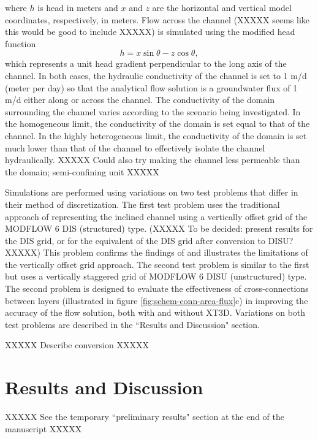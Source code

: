 \documentclass{article}
\begin{document}
\noindent where $h$ is head in meters and $x$ and $z$ are the horizontal and vertical model coordinates, respectively, in meters. Flow across the channel (XXXXX seems like this would be good to include XXXXX) is simulated using the modified head function
\begin{equation}
\label{eqn:head_analyt_across}
h = x \sin \theta - z \cos \theta,
\end{equation}
which represents a unit head gradient perpendicular to the long axis of the channel. In both cases, the hydraulic conductivity of the channel is set to 1 m/d (meter per day) so that the analytical flow solution is a groundwater flux of 1 m/d either along or across the channel. The conductivity of the domain surrounding the channel varies according to the scenario being investigated. In the homogeneous limit, the conductivity of the domain is set equal to that of the channel. In the highly heterogeneous limit, the conductivity of the domain is set much lower than that of the channel to effectively isolate the channel hydraulically. XXXXX Could also try making the channel less permeable than the domain; semi-confining unit XXXXX

Simulations are performed using variations on two test problems that differ in their method of discretization. The first test problem uses the traditional approach of representing the inclined channel using a vertically offset grid of the MODFLOW 6 DIS (structured) type. (XXXXX To be decided: present results for the DIS grid, or for the equivalent of the DIS grid after conversion to DISU? XXXXX) This problem confirms the findings of \cite{bardot2022} and illustrates the limitations of the vertically offset grid approach. The second test problem is similar to the first but uses a vertically staggered grid of MODFLOW 6 DISU (unstructured) type. The second problem is designed to evaluate the effectiveness of cross-connections between layers (illustrated in figure \ref{fig:schem-conn-area-flux}c) in improving the accuracy of the flow solution, both with and without XT3D. Variations on both test problems are described in the ``Results and Discussion" section.

XXXXX Describe conversion XXXXX

\section{Results and Discussion}

XXXXX See the temporary ``preliminary results" section at the end of the manuscript XXXXX
\end{document}
